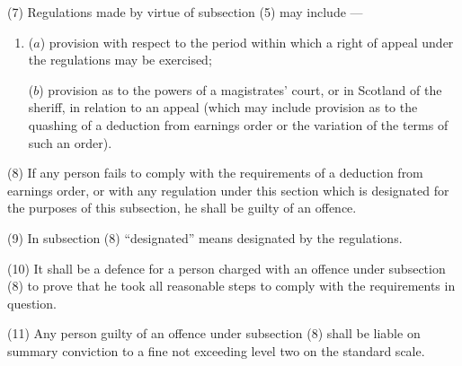 \documentclass[12pt,a4paper]{article}
\begin{document}
(7) Regulations made by virtue of subsection (5)  may include%
—
\begin{enumerate}\item[]
($a$) provision with respect to the period within which a right of appeal under the regulations may be exercised;

($b$)  %
provision as to the powers of a magistrates' court, or in Scotland of the sheriff, in relation to an appeal (which may include provision as to the quashing of a deduction from earnings order or the variation of the terms of such an order).
\end{enumerate}

(8) If any person fails to comply with the requirements of a deduction from earnings order, or with any regulation under this section which is designated for the purposes of this subsection, he shall be guilty of an offence.

(9) In subsection (8)  “designated” means designated by the regulations.

(10) It shall be a defence for a person charged with an offence under subsection (8)  to prove that he took all reasonable steps to comply with the requirements in question.

(11) Any person guilty of an offence under subsection (8)  shall be liable on summary conviction to a fine not exceeding level two on the standard scale.

\end{document}
